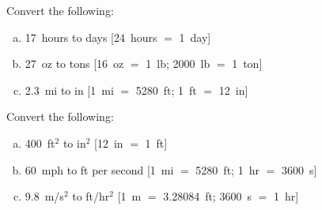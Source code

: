 \documentclass[11pt,letterpaper]{article}
\begin{document}
\newpage



 Convert the following:
\begin{enumerate}[(a)]
\item 17~hours to days [24~hours $=$ 1~day]
\item 27~oz to tons [16~oz $=$ 1~lb; 2000~lb $=$ 1~ton]
\item 2.3~mi to in [1~mi $=$ 5280~ft; 1~ft $=$ 12~in]
\end{enumerate}



\newpage



 Convert the following:
\begin{enumerate}[(a)]
\item 400~ft$^2$ to in$^2$ [12~in $=$ 1~ft]
\item 60~mph to ft per second [1~mi $=$ 5280~ft; 1~hr $=$ 3600~s]
\item 9.8~m/s$^2$ to ft/hr$^2$ [1~m $=$ 3.28084~ft; 3600~s $=$ 1~hr]
\end{enumerate}
\end{document}
